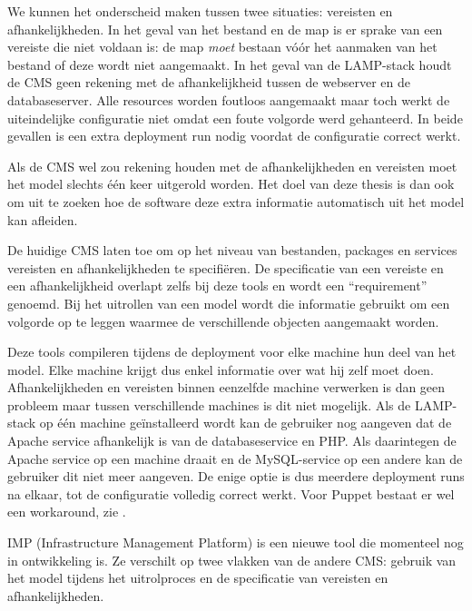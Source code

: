 We kunnen het onderscheid maken tussen twee situaties: vereisten en afhankelijkheden.
In het geval van het bestand en de map is er sprake van een vereiste die niet voldaan is: de map \emph{moet} bestaan v\'o\'or het aanmaken van het bestand of deze wordt niet aangemaakt.
In het geval van de LAMP-stack houdt de CMS geen rekening met de afhankelijkheid tussen de webserver en de databaseserver.
Alle resources worden foutloos aangemaakt maar toch werkt de uiteindelijke configuratie niet omdat een foute volgorde werd gehanteerd.
In beide gevallen is een extra deployment run nodig voordat de configuratie correct werkt.

Als de CMS wel zou rekening houden met de afhankelijkheden en vereisten moet het model slechts \'e\'en keer uitgerold worden.
Het doel van deze thesis is dan ook om uit te zoeken hoe de software deze extra informatie automatisch uit het model kan afleiden.

De huidige CMS laten toe om op het niveau van bestanden, packages en services vereisten en afhankelijkheden te specifi\"eren.
De specificatie van een vereiste en een afhankelijkheid overlapt zelfs bij deze tools en wordt een ``requirement'' genoemd.
Bij het uitrollen van een model wordt die informatie gebruikt om een volgorde op te leggen waarmee de verschillende objecten aangemaakt worden.

Deze tools compileren tijdens de deployment voor elke machine hun deel van het model.
Elke machine krijgt dus enkel informatie over wat hij zelf moet doen.
Afhankelijkheden en vereisten binnen eenzelfde machine verwerken is dan geen probleem maar tussen verschillende machines is dit niet mogelijk.
Als de LAMP-stack op \'e\'en machine ge\"installeerd wordt kan de gebruiker nog aangeven dat de Apache service afhankelijk is van de databaseservice en PHP.
Als daarintegen de Apache service op een machine draait en de MySQL-service op een andere kan de gebruiker dit niet meer aangeven.
De enige optie is dus meerdere deployment runs na elkaar, tot de configuratie volledig correct werkt.
Voor Puppet bestaat er wel een workaround, zie \cite{puppet-orchestration}.

IMP (Infrastructure Management Platform) is een nieuwe tool die momenteel nog in ontwikkeling is.
Ze verschilt op twee vlakken van de andere CMS: gebruik van het model tijdens het uitrolproces en de specificatie van vereisten en afhankelijkheden.%

